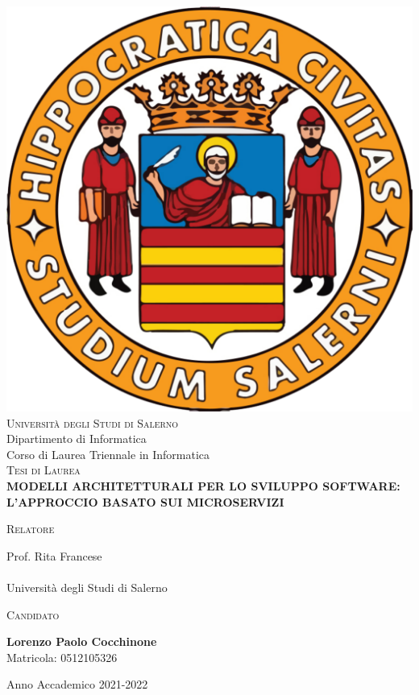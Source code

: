 \begin{titlepage}
\changepage{}{}{}{-7.5 mm}{}{}{}{}{}


\begin{center}
\includegraphics[width=.15\columnwidth, angle=0]{capitoli/immagini/fronte/logo-unisa.pdf}\\ %
\vspace{0.5cm}
{\Large \scshape Università degli Studi di Salerno}\\
\vspace{0.5cm}
{\Large Dipartimento di Informatica}\\
\vspace{0.5cm}
{\Large Corso di Laurea Triennale in Informatica}\\
\vspace{1.5cm}
{\Large \scshape Tesi di Laurea} \\
\vspace{3cm}
{\Huge \bfseries MODELLI ARCHITETTURALI PER LO SVILUPPO SOFTWARE: L'APPROCCIO BASATO SUI MICROSERVIZI} \\
\vspace{3cm}

\begin{minipage}[t]{7cm}
\flushleft
{\large \textsc{Relatore}}

{\large Prof. Rita Francese} \\
{\large $ $} \\
Università degli Studi di Salerno \\[0.25cm]
\end{minipage}
\hfill
\begin{minipage}[t]{7cm}
\flushright
{\large \textsc{Candidato}}

{\large \textbf{Lorenzo Paolo Cocchinone}} \\
Matricola: 0512105326
\end{minipage}

\vspace{2.5cm}

{\small Anno Accademico 2021-2022} %
%
%
\end{center}

\end{titlepage}
